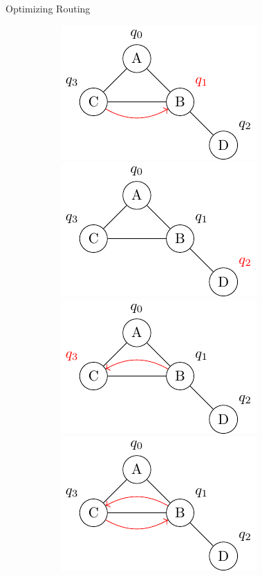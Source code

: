 \documentclass{beamer}
\begin{document}
\begin{frame}{Optimizing Routing}
\begin{figure}
\begin{subfigure}[b]{0.45\textwidth}
\begin{overprint}
		\centering
		\includegraphics[scale=0.6]{figures/pi_2_3}
		\onslide<8>\centering
		\includegraphics[scale=0.6]{figures/pi_2_4}	
		\onslide<9>\centering
		\includegraphics[scale=0.6]{figures/pi_2_5}
		\onslide<10->\centering
		\includegraphics[scale=0.6]{figures/pi_2_6}		
		\end{overprint}
     \end{subfigure}
     \hfill %
\end{figure}
\vspace{-1cm}

\end{frame}
\end{document}
